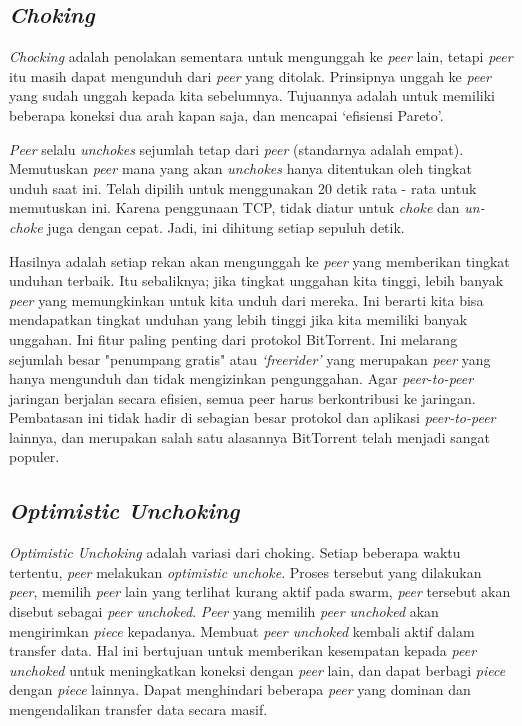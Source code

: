 \subsection{\emph{Choking}}

\emph{Chocking} adalah penolakan sementara untuk mengunggah ke \emph{peer} lain, tetapi \emph{peer} itu masih dapat mengunduh dari \emph{peer} yang ditolak. Prinsipnya unggah ke \emph{peer} yang sudah unggah kepada kita sebelumnya. Tujuannya adalah untuk memiliki beberapa koneksi dua arah kapan saja, dan mencapai `efisiensi Pareto'.
	
\emph{Peer} selalu \emph{unchokes} sejumlah tetap dari \emph{peer} (standarnya adalah empat). Memutuskan \emph{peer} mana yang akan \emph{unchokes} hanya ditentukan oleh tingkat unduh saat ini. Telah dipilih untuk menggunakan 20 detik rata - rata untuk memutuskan ini. Karena penggunaan TCP, tidak diatur untuk \emph{choke} dan \emph{un-choke} juga dengan cepat. Jadi, ini dihitung setiap sepuluh detik.
	
Hasilnya adalah setiap rekan akan mengunggah ke \emph{peer} yang memberikan tingkat unduhan terbaik. Itu sebaliknya; jika tingkat unggahan kita tinggi, lebih banyak \emph{peer} yang memungkinkan untuk kita unduh dari mereka. Ini berarti kita bisa mendapatkan tingkat unduhan yang lebih tinggi jika kita memiliki banyak unggahan. Ini fitur paling penting dari protokol BitTorrent. Ini melarang sejumlah besar "penumpang gratis" atau \emph{`freerider'} yang merupakan \emph{peer} yang hanya mengunduh dan tidak mengizinkan pengunggahan. Agar \emph{peer-to-peer} jaringan berjalan secara efisien, semua peer harus berkontribusi ke jaringan. Pembatasan ini tidak hadir di sebagian besar protokol dan aplikasi \emph{peer-to-peer} lainnya, dan merupakan salah satu alasannya BitTorrent telah menjadi sangat populer.

\subsection{\emph{Optimistic Unchoking}}

\emph{Optimistic Unchoking} adalah variasi dari choking. Setiap beberapa waktu tertentu, \emph{peer} melakukan \emph{optimistic unchoke}. Proses tersebut yang dilakukan \emph{peer}, memilih \emph{peer} lain yang terlihat kurang aktif pada swarm, \emph{peer} tersebut akan disebut sebagai \emph{peer unchoked}. \emph{Peer} yang memilih \emph{peer unchoked} akan mengirimkan \emph{piece} kepadanya. Membuat \emph{peer unchoked} kembali aktif dalam transfer data. Hal ini bertujuan untuk memberikan kesempatan kepada \emph{peer unchoked} untuk meningkatkan koneksi dengan \emph{peer} lain, dan dapat berbagi \emph{piece} dengan \emph{piece} lainnya. Dapat menghindari beberapa \emph{peer} yang dominan dan mengendalikan transfer data secara masif.

